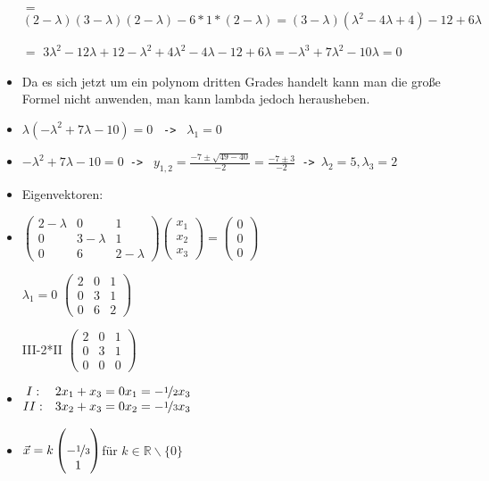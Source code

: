 \documentclass{article}
\newcommand{\R}{\mathbb{R}}
\begin{document}
\begin{itemize}
\begin{itemize}
\begin{itemize}
				\item[$=$]{$(2-\lambda)(3-\lambda)(2-\lambda)-6*1*(2-\lambda)=(3-\lambda)(\lambda^2-4\lambda+4)-12+6\lambda$}
				\item[$=$]{$3\lambda^2-12\lambda+12-\lambda^2+4\lambda^2-4\lambda-12+6\lambda=-\lambda^3+7\lambda^2-10\lambda=0$}
				\item{Da es sich jetzt um ein polynom dritten Grades handelt kann man die große Formel nicht anwenden, man kann lambda jedoch herausheben.}
				\item{$\lambda(-\lambda^2+7\lambda-10)=0$ \texttt{ -> } $\lambda_1=0$}
				\item{$-\lambda^2+7\lambda-10=0$\texttt{ -> } $y_{1,2}=\frac{-7\pm\sqrt{49-40}}{-2}=\frac{-7\pm3}{-2}$\texttt{ -> }$\lambda_2=5, \lambda_3=2$}
				\item{Eigenvektoren:}
				\item{$\begin{pmatrix} 2-\lambda & 0 & 1 \\ 0 & 3-\lambda & 1 \\ 0 & 6 & 2-\lambda \end{pmatrix}\begin{pmatrix} x_1 \\ x_2 \\ x_3 \end{pmatrix}=\begin{pmatrix} 0 \\ 0 \\ 0 \end{pmatrix}$}
				\item[$\lambda_1=0$]{$\begin{pmatrix} 2 & 0 & 1 \\ 0 & 3 & 1 \\ 0 & 6 & 2 \end{pmatrix}$}
				\item[III-2*II]{$\begin{pmatrix} 2 & 0 & 1 \\ 0 & 3 & 1 \\ 0 & 0 & 0 \end{pmatrix}$}
				\item{$\begin{matrix} I: & 2x_1+x_3=0 \\ II: & 3x_2+x_3=0 \end{matrix}\begin{matrix} x_1=-\nicefrac{1}{2}x_3 \\ x_2=-\nicefrac{1}{3}x_3\end{matrix}$}
				\item{$\vec{x}=k \begin{pmatrix}  \\ -\nicefrac{1}{3} \\ 1 \end{pmatrix}$für $k\in\R\backslash\{0\}$}

\end{itemize}
\end{itemize}
\end{itemize}
\end{document}
